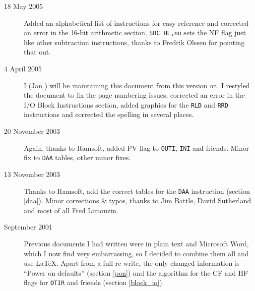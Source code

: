 \begin{description}
	\item[18 May 2005]
	Added an alphabetical list of instructions for easy reference and corrected an error in the 16-bit arithmetic section, {\tt SBC HL,nn} sets the NF flag just like other subtraction instructions, thanks to Fredrik Olssen for pointing that out.

	\item[4 April 2005]
	I (Jan ) will be maintaining this document from this version on. I restyled the document to fix the page numbering issues, corrected an error in the I/O Block Instructions section, added graphics for the {\tt RLD} and {\tt RRD} instructions and corrected the spelling in several places.

	\item[20 November 2003]
	Again, thanks to Ramsoft, added PV flag to {\tt OUTI}, {\tt INI} and friends. Minor fix to {\tt DAA} tables, other minor fixes.

	\item[13 November 2003]
	Thanks to Ramsoft, add the correct tables for the {\tt DAA} instruction (section \ref{daa}). Minor corrections \& typos, thanks to Jim Battle, David Sutherland and most of all Fred Limouzin.

	\item[September 2001]
	Previous documents I had written were in plain text and Microsoft Word, which I now find very embarrassing, so I decided to combine them all and use {\LaTeX}. Apart from a full re-write, the only changed information is ``Power on defaults'' (section \ref{pon}) and the algorithm for the CF and HF flags for {\tt OTIR} and friends (section \ref{block_io}).

\end{description}


\pagebreak
\IntentionallyEmpty
\pagebreak
